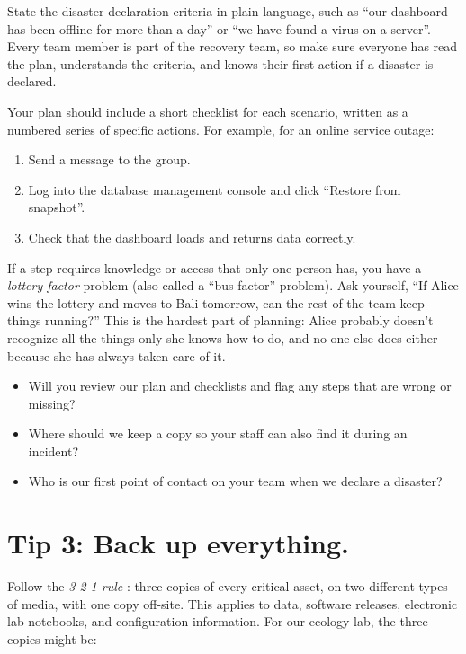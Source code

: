 \documentclass[10pt,letterpaper]{article}
\begin{document}
State the disaster declaration criteria in plain language, such as ``our
dashboard has been offline for more than a day'' or ``we have found a virus on a
server''.  Every team member is part of the recovery team, so make sure everyone
has read the plan, understands the criteria, and knows their first action if a
disaster is declared.

Your plan should include a short checklist for each scenario, written as a
numbered series of specific actions. For example, for an online service outage:

\begin{enumerate}
\item Send a message to the  group.
\item Log into the database management console and click ``Restore from snapshot''.
\item Check that the dashboard loads and returns data correctly.
\end{enumerate}

\begin{notebox}
  If a step requires knowledge or access that only one person has, you have a
  \emph{lottery-factor} problem (also called a ``bus factor'' problem). Ask
  yourself, ``If Alice wins the lottery and moves to Bali tomorrow, can the rest
  of the team keep things running?''  This is the hardest part of planning: Alice
  probably doesn't recognize all the things only she knows how to do, and no one
  else does either because she has always taken care of it.
\end{notebox}

\begin{notebox}
  \begin{itemize}
  \item Will you review our plan and checklists and flag any steps that are wrong or missing?
  \item Where should we keep a copy so your staff can also find it during an incident?
  \item Who is our first point of contact on your team when we declare a disaster?
  \end{itemize}
\end{notebox}

\section*{Tip 3: Back up everything.}

Follow the \emph{3-2-1 rule} \cite{krogh2009}: three copies of every critical
asset, on two different types of media, with one copy off-site. This applies to
data, software releases, electronic lab notebooks, and configuration information.
For our ecology lab, the three copies might be:
\end{document}
